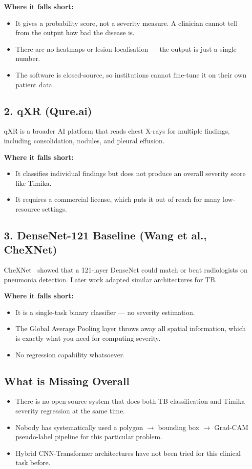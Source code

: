 \documentclass[12pt]{report}
\begin{document}
\textbf{Where it falls short:}
\begin{itemize}
    \item It gives a probability score, not a severity measure. A clinician cannot tell from the output how bad the disease is.
    \item There are no heatmaps or lesion localisation --- the output is just a single number.
    \item The software is closed-source, so institutions cannot fine-tune it on their own patient data.
\end{itemize}

\subsection*{2. qXR (Qure.ai)}
qXR is a broader AI platform that reads chest X-rays for multiple findings, including consolidation, nodules, and pleural effusion.

\textbf{Where it falls short:}
\begin{itemize}
    \item It classifies individual findings but does not produce an overall severity score like Timika.
    \item It requires a commercial license, which puts it out of reach for many low-resource settings.
\end{itemize}

\subsection*{3. DenseNet-121 Baseline (Wang et al., CheXNet)}
CheXNet~\cite{ref6} showed that a 121-layer DenseNet could match or beat radiologists on pneumonia detection. Later work adapted similar architectures for TB.

\textbf{Where it falls short:}
\begin{itemize}
    \item It is a single-task binary classifier --- no severity estimation.
    \item The Global Average Pooling layer throws away all spatial information, which is exactly what you need for computing severity.
    \item No regression capability whatsoever.
\end{itemize}

\subsection*{What is Missing Overall}
\begin{itemize}
    \item There is no open-source system that does both TB classification and Timika severity regression at the same time.
    \item Nobody has systematically used a polygon $\rightarrow$ bounding box $\rightarrow$ Grad-CAM pseudo-label pipeline for this particular problem.
    \item Hybrid CNN-Transformer architectures have not been tried for this clinical task before.
\end{itemize}
\end{document}
